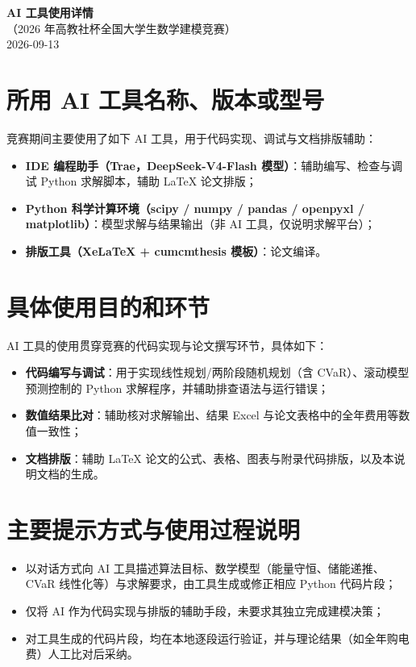 \documentclass[11pt,a4paper]{article}
\begin{document}
\begin{center}
    {\LARGE\bfseries AI 工具使用详情}\\[0.6em]
    {\normalsize （2026 年高教社杯全国大学生数学建模竞赛）}\\[0.2em]
    {\normalsize 2026-09-13}
\end{center}

\section{所用 AI 工具名称、版本或型号}
竞赛期间主要使用了如下 AI 工具，用于代码实现、调试与文档排版辅助：
\begin{itemize}
    \item \textbf{IDE 编程助手（Trae，DeepSeek-V4-Flash 模型）}：辅助编写、检查与调试 Python 求解脚本，辅助 LaTeX 论文排版；
    \item \textbf{Python 科学计算环境（scipy / numpy / pandas / openpyxl / matplotlib）}：模型求解与结果输出（非 AI 工具，仅说明求解平台）；
    \item \textbf{排版工具（XeLaTeX + cumcmthesis 模板）}：论文编译。
\end{itemize}

\section{具体使用目的和环节}
AI 工具的使用贯穿竞赛的代码实现与论文撰写环节，具体如下：
\begin{itemize}
    \item \textbf{代码编写与调试}：用于实现线性规划/两阶段随机规划（含 CVaR）、滚动模型预测控制的 Python 求解程序，并辅助排查语法与运行错误；
    \item \textbf{数值结果比对}：辅助核对求解输出、结果 Excel 与论文表格中的全年费用等数值一致性；
    \item \textbf{文档排版}：辅助 LaTeX 论文的公式、表格、图表与附录代码排版，以及本说明文档的生成。
\end{itemize}

\section{主要提示方式与使用过程说明}
\begin{itemize}
    \item 以对话方式向 AI 工具描述算法目标、数学模型（能量守恒、储能递推、CVaR 线性化等）与求解要求，由工具生成或修正相应 Python 代码片段；
    \item 仅将 AI 作为代码实现与排版的辅助手段，未要求其独立完成建模决策；
    \item 对工具生成的代码片段，均在本地逐段运行验证，并与理论结果（如全年购电费）人工比对后采纳。
\end{itemize}
\end{document}
